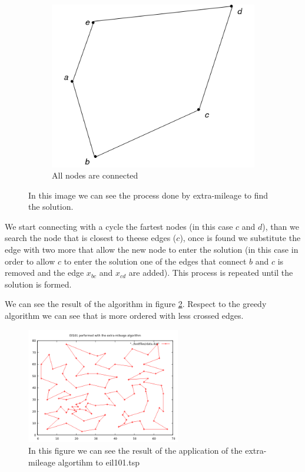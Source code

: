 \begin{figure}
\begin{subfigure}{0.3\textwidth}
		\includegraphics[width=\textwidth]{images/extra_5}
		\caption{All nodes are connected}
	\end{subfigure}
	\caption{In this image we can see the process done by extra-mileage to find the solution.}
	\label{img:extra}
\end{figure}

We start connecting with a cycle the fartest nodes (in this case $c$ and $d$), than we search the node that is closest to theese edges ($c$), once is found we substitute the edge with two more that allow the new node to enter the solution (in this case in order to allow $c$ to enter the solution one of the edges that connect $b$ and $c$ is removed and the edge $x_{bc}$ and $x_{cd}$ are added). This process is repeated until the solution is formed.

We can see the result of the algorithm in figure \ref{img:extra_sol}. Respect to the greedy algorithm we can see that is more ordered with less crossed edges.

\begin{figure}
	\centering
	\includegraphics[width=0.6\textwidth]{images/eil101_extra_mileage}
	\caption{In this figure we can see the result of the application of the extra-mileage algortihm to eil101.tsp}
	\label{img:extra_sol}
\end{figure}

